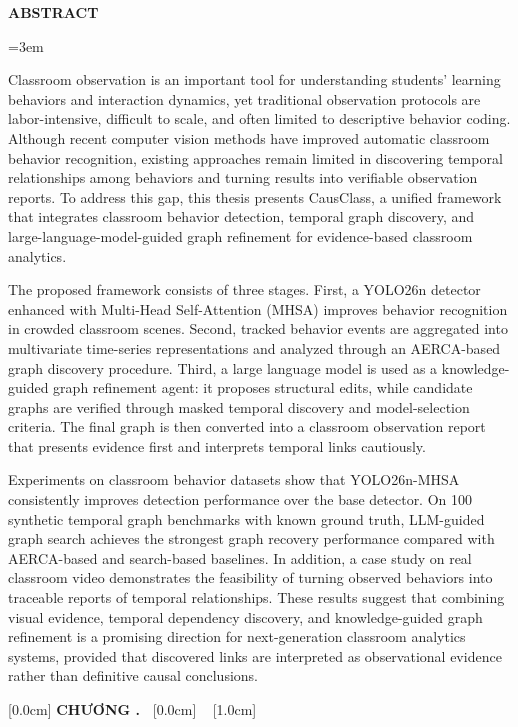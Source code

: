 \documentclass[a4paper,13pt,3p,twoside]{report}
\numberwithin{equation}{chapter}
\theoremstyle{definition}
\newcommand{\frontmattertitle}[1]{%
\begin{center}
    \Large{\textbf{#1}}\\
\end{center}
\vspace{1cm}}
\newenvironment{nohyphenparagraphs}{%
\begingroup
\hyphenpenalty=10000
\exhyphenpenalty=10000
\emergencystretch=3em
}{%
\par
\endgroup}
\begin{document}
\newpage
{}
\frontmattertitle{ABSTRACT}
\begin{nohyphenparagraphs}
Classroom observation is an important tool for understanding students' learning behaviors and interaction dynamics, yet traditional observation protocols are labor-intensive, difficult to scale, and often limited to descriptive behavior coding. Although recent computer vision methods have improved automatic classroom behavior recognition, existing approaches remain limited in discovering temporal relationships among behaviors and turning results into verifiable observation reports. To address this gap, this thesis presents CausClass, a unified framework that integrates classroom behavior detection, temporal graph discovery, and large-language-model-guided graph refinement for evidence-based classroom analytics.

The proposed framework consists of three stages. First, a YOLO26n detector enhanced with Multi-Head Self-Attention (MHSA) improves behavior recognition in crowded classroom scenes. Second, tracked behavior events are aggregated into multivariate time-series representations and analyzed through an AERCA-based graph discovery procedure. Third, a large language model is used as a knowledge-guided graph refinement agent: it proposes structural edits, while candidate graphs are verified through masked temporal discovery and model-selection criteria. The final graph is then converted into a classroom observation report that presents evidence first and interprets temporal links cautiously.

Experiments on classroom behavior datasets show that YOLO26n-MHSA consistently improves detection performance over the base detector. On 100 synthetic temporal graph benchmarks with known ground truth, LLM-guided graph search achieves the strongest graph recovery performance compared with AERCA-based and search-based baselines. In addition, a case study on real classroom video demonstrates the feasibility of turning observed behaviors into traceable reports of temporal relationships. These results suggest that combining visual evidence, temporal dependency discovery, and knowledge-guided graph refinement is a promising direction for next-generation classroom analytics systems, provided that discovered links are interpreted as observational evidence rather than definitive causal conclusions.
\end{nohyphenparagraphs}

\newpage
{}
\renewcommand*\contentsname{MỤC LỤC}
    [0.0cm]
    {\bfseries\vspace{0.3cm}}
    {{\bfseries{\scshape} CHƯƠNG \thecontentslabel.\ }}
    {}
    {\contentspage}
    [0.0cm]
    {\vspace{0.3cm}}
    {\thecontentslabel\ }
    {}
    {\contentspage}
    [1.0cm]
    {\vspace{0.3cm}}
    {\thecontentslabel\ }
    {}
    {\contentspage}
\tableofcontents
\thispagestyle{empty}
\cleardoublepage
\end{document}
